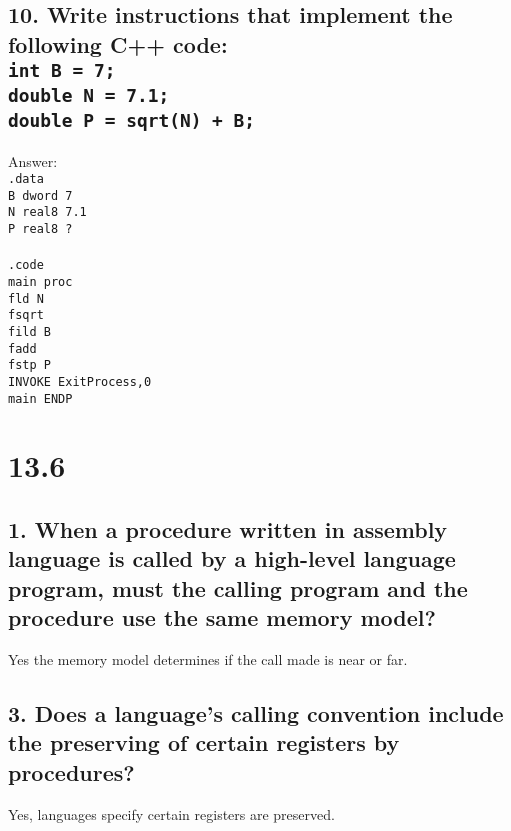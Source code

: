 \documentclass[12pt]{article}
\begin{document}
\subsection*{10. Write instructions that implement the following C++ code: \\
\texttt{int B = 7; \\
double N = 7.1; \\
double P = sqrt(N) + B;}}
%
Answer: \\
\texttt{.data \\
	B dword 7 \\
	N real8 7.1 \\
	P real8 ? \\
	\\
	.code \\
	main proc \\
	fld N \\
	fsqrt  \\
	fild B \\
	fadd \\
	fstp P \\
	INVOKE ExitProcess,0 \\
	main ENDP}

\section*{13.6}
%
\subsection*{1. When a procedure written in assembly language is called by a high-level language program, must the calling program and the procedure use the same memory model?}
%
Yes the memory model determines if the call made is near or far.
\subsection*{3.  Does a language’s calling convention include the preserving of certain registers by procedures?}
%
Yes, languages specify certain registers are preserved. 
\end{document}
